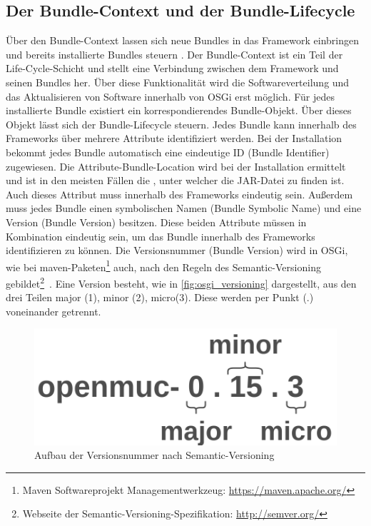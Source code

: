 \subsection{Der Bundle-Context und der Bundle-Lifecycle}
\label{subsec:bundle_lifecycle}

Über den Bundle-Context lassen sich neue Bundles in das Framework einbringen und bereits installierte Bundles steuern \cite{osgi_praktiker}.
Der Bundle-Context ist ein Teil der Life-Cycle-Schicht und stellt eine Verbindung zwischen dem Framework und seinen Bundles her.
Über diese Funktionalität wird die Softwareverteilung und das Aktualisieren von Software innerhalb von \ac{OSGi} erst möglich.
Für jedes installierte Bundle existiert ein korrespondierendes Bundle-Objekt. Über dieses Objekt lässt sich der Bundle-Lifecycle steuern. 
Jedes Bundle kann innerhalb des Frameworks über mehrere Attribute identifiziert werden. Bei der Installation bekommt jedes Bundle 
automatisch eine eindeutige ID (Bundle Identifier) zugewiesen. 
Die Attribute-Bundle-Location wird bei der Installation ermittelt und ist in den meisten Fällen die , unter welcher die \ac{JAR}-Datei zu finden ist.
Auch dieses Attribut muss innerhalb des Frameworks eindeutig sein.
Außerdem muss jedes Bundle einen symbolischen Namen (Bundle Symbolic Name) und eine Version (Bundle Version) besitzen. 
Diese beiden Attribute müssen in Kombination eindeutig sein, um das Bundle innerhalb des Frameworks identifizieren zu können.
Die Versionsnummer (Bundle Version) wird in \ac{OSGi}, wie bei maven-Paketen\footnote{Maven Softwareprojekt Managementwerkzeug: \url{https://maven.apache.org/}}
auch, nach den Regeln des Semantic-Versioning gebildet\footnote{Webseite der Semantic-Versioning-Spezifikation: \url{http://semver.org/}}\ \cite[S. 54]{osgi_r6}.
Eine Version besteht, wie in \autoref{fig:osgi_versioning} dargestellt, aus den drei Teilen major (1), minor (2), micro(3). Diese werden per Punkt (.) voneinander getrennt.
\begin{figure}[h]
  \centering
  \includegraphics[scale=0.15]{content/pictures/semantic_versioning.png}
  \caption{Aufbau der Versionsnummer nach Semantic-Versioning}
  \label{fig:osgi_versioning}
\end{figure}

